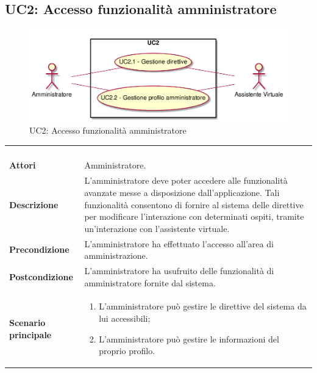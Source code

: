 \newpage\subsection{UC2: Accesso funzionalità amministratore}
\label{UC2}
\begin{figure}[h]
\centering
\includegraphics[width=\textwidth,height=\textheight,keepaspectratio]{images/UseCaseUC2.png}
\caption{UC2: Accesso funzionalità amministratore}
\end{figure}
\begin{longtable}{l|p{10cm}}
\rowcolor[gray]{0.8} \multicolumn{2}{c}{} \\
\rowcolor[gray]{0.8} \multicolumn{2}{c}{\textbf{UC2 - Accesso funzionalità amministratore}} \\
\rowcolor[gray]{0.8} \multicolumn{2}{c}{} \\
\hline
&\\
\textbf{Attori} & Amministratore.\\[7pt]
\textbf{Descrizione} & L'amministratore deve poter accedere alle funzionalità avanzate messe a disposizione dall'applicazione. Tali funzionalità consentono di fornire al sistema delle direttive per modificare l'interazione con determinati ospiti, tramite un'interazione con l'assistente virtuale.\\[7pt]
\textbf{Precondizione} & L'amministratore ha effettuato l'accesso all'area di amministrazione.\\[7pt]
\textbf{Postcondizione} & L'amministratore ha usufruito delle funzionalità di amministratore fornite dal sistema.\\[7pt]
\textbf{Scenario principale} &\begin{enumerate}
\item  L'amministratore può gestire le direttive del sistema da lui accessibili;
\item  L'amministratore può gestire le informazioni del proprio profilo.
\end{enumerate}
\\[7pt]\hline
\end{longtable}

